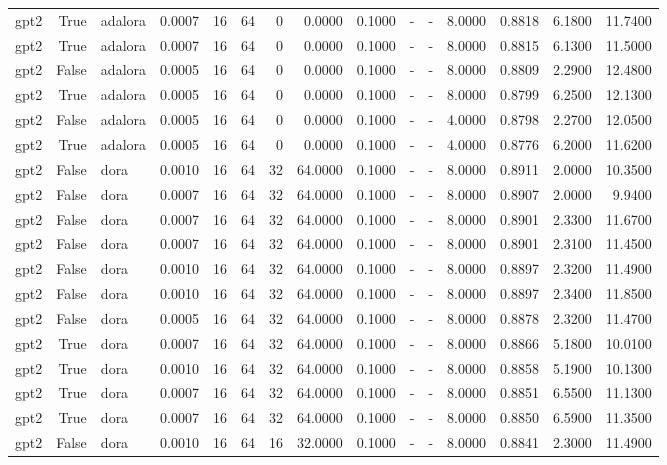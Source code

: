 \begin{tabular}{lrlrrrrrrlllrrr}
gpt2 & True & adalora & 0.0007 & 16 & 64 & 0 & 0.0000 & 0.1000 & - & - & 8.0000 & 0.8818 & 6.1800 & 11.7400 \\
gpt2 & True & adalora & 0.0007 & 16 & 64 & 0 & 0.0000 & 0.1000 & - & - & 8.0000 & 0.8815 & 6.1300 & 11.5000 \\
gpt2 & False & adalora & 0.0005 & 16 & 64 & 0 & 0.0000 & 0.1000 & - & - & 8.0000 & 0.8809 & 2.2900 & 12.4800 \\
gpt2 & True & adalora & 0.0005 & 16 & 64 & 0 & 0.0000 & 0.1000 & - & - & 8.0000 & 0.8799 & 6.2500 & 12.1300 \\
gpt2 & False & adalora & 0.0005 & 16 & 64 & 0 & 0.0000 & 0.1000 & - & - & 4.0000 & 0.8798 & 2.2700 & 12.0500 \\
gpt2 & True & adalora & 0.0005 & 16 & 64 & 0 & 0.0000 & 0.1000 & - & - & 4.0000 & 0.8776 & 6.2000 & 11.6200 \\
gpt2 & False & dora & 0.0010 & 16 & 64 & 32 & 64.0000 & 0.1000 & - & - & 8.0000 & 0.8911 & 2.0000 & 10.3500 \\
gpt2 & False & dora & 0.0007 & 16 & 64 & 32 & 64.0000 & 0.1000 & - & - & 8.0000 & 0.8907 & 2.0000 & 9.9400 \\
gpt2 & False & dora & 0.0007 & 16 & 64 & 32 & 64.0000 & 0.1000 & - & - & 8.0000 & 0.8901 & 2.3300 & 11.6700 \\
gpt2 & False & dora & 0.0007 & 16 & 64 & 32 & 64.0000 & 0.1000 & - & - & 8.0000 & 0.8901 & 2.3100 & 11.4500 \\
gpt2 & False & dora & 0.0010 & 16 & 64 & 32 & 64.0000 & 0.1000 & - & - & 8.0000 & 0.8897 & 2.3200 & 11.4900 \\
gpt2 & False & dora & 0.0010 & 16 & 64 & 32 & 64.0000 & 0.1000 & - & - & 8.0000 & 0.8897 & 2.3400 & 11.8500 \\
gpt2 & False & dora & 0.0005 & 16 & 64 & 32 & 64.0000 & 0.1000 & - & - & 8.0000 & 0.8878 & 2.3200 & 11.4700 \\
gpt2 & True & dora & 0.0007 & 16 & 64 & 32 & 64.0000 & 0.1000 & - & - & 8.0000 & 0.8866 & 5.1800 & 10.0100 \\
gpt2 & True & dora & 0.0010 & 16 & 64 & 32 & 64.0000 & 0.1000 & - & - & 8.0000 & 0.8858 & 5.1900 & 10.1300 \\
gpt2 & True & dora & 0.0007 & 16 & 64 & 32 & 64.0000 & 0.1000 & - & - & 8.0000 & 0.8851 & 6.5500 & 11.1300 \\
gpt2 & True & dora & 0.0007 & 16 & 64 & 32 & 64.0000 & 0.1000 & - & - & 8.0000 & 0.8850 & 6.5900 & 11.3500 \\
gpt2 & False & dora & 0.0010 & 16 & 64 & 16 & 32.0000 & 0.1000 & - & - & 8.0000 & 0.8841 & 2.3000 & 11.4900 \\

\end{tabular}
